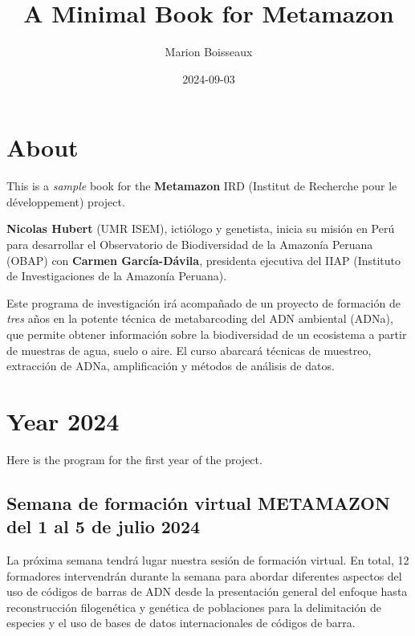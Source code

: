 \documentclass[
]{book}
\title{A Minimal Book for Metamazon}
\author{Marion Boisseaux}
\date{2024-09-03}
\begin{document}
\maketitle

{
\setcounter{tocdepth}{1}
\tableofcontents
}
\hypertarget{about}{%
\chapter{About}\label{about}}

This is a \emph{sample} book for the \textbf{Metamazon} IRD (Institut de Recherche pour le développement) project.

\textbf{Nicolas Hubert} (UMR ISEM), ictiólogo y genetista, inicia su misión en Perú para desarrollar el Observatorio de Biodiversidad de la Amazonía Peruana (OBAP) con \textbf{Carmen García-Dávila}, presidenta ejecutiva del IIAP (Instituto de Investigaciones de la Amazonía Peruana).

Este programa de investigación irá acompañado de un proyecto de formación de \emph{tres} años en la potente técnica de metabarcoding del ADN ambiental (ADNa), que permite obtener información sobre la biodiversidad de un ecosistema a partir de muestras de agua, suelo o aire. El curso abarcará técnicas de muestreo, extracción de ADNa, amplificación y métodos de análisis de datos.

\hypertarget{year-2024}{%
\chapter{Year 2024}\label{year-2024}}

Here is the program for the first year of the project.

\hypertarget{semana-de-formaciuxf3n-virtual-metamazon-del-1-al-5-de-julio-2024}{%
\section{Semana de formación virtual METAMAZON del 1 al 5 de julio 2024}\label{semana-de-formaciuxf3n-virtual-metamazon-del-1-al-5-de-julio-2024}}

La próxima semana tendrá lugar nuestra sesión de formación virtual. En total, 12 formadores intervendrán durante la semana para abordar diferentes aspectos del uso de códigos de barras de ADN desde la presentación general del enfoque hasta reconstrucción filogenética y genética de poblaciones para la delimitación de especies y el uso de bases de datos internacionales de códigos de barra.
\end{document}

